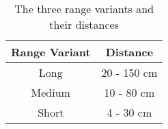 \begin{table}[H]
\centering
\setlength\extrarowheight{3pt}
\begin{tabulary}{\textwidth}{|C|C|}
\hline
\textbf{Range Variant} & \textbf{Distance} \\
\hline
Long & 20 - 150 cm \\
\hline
Medium & 10 - 80 cm \\
\hline
Short & 4 - 30 cm \\
\hline
\end{tabulary}
\caption{The three range variants and their distances}
\label{mindsensorranges}
\end{table}
\FloatBarrier